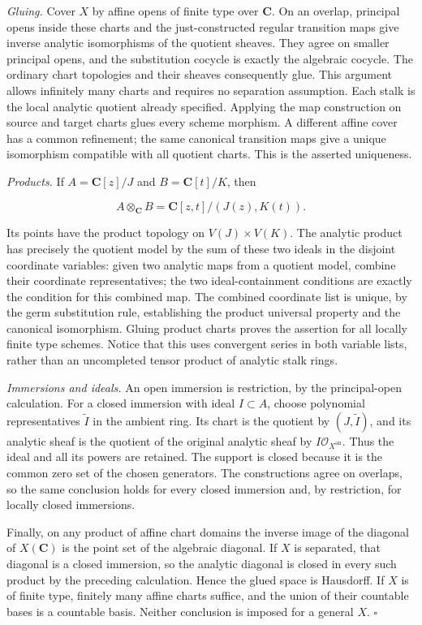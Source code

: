 \documentclass[11pt]{article}
\begin{document}
\emph{Gluing.} Cover \(X\) by affine opens of finite type over
\(\mathbf C\). On an overlap, principal opens inside these charts and
the just-constructed regular transition maps give inverse analytic
isomorphisms of the quotient sheaves. They agree on smaller principal
opens, and the substitution cocycle is exactly the algebraic cocycle.
The ordinary chart topologies and their sheaves consequently glue. This
argument allows infinitely many charts and requires no separation
assumption. Each stalk is the local analytic quotient already specified.
Applying the map construction on source and target charts glues every
scheme morphism. A different affine cover has a common refinement; the
same canonical transition maps give a unique isomorphism compatible with
all quotient charts. This is the asserted uniqueness.

\emph{Products.} If \(A=\mathbf C[z]/J\) and \(B=\mathbf C[t]/K\), then

\[
A\otimes_{\mathbf C}B=\mathbf C[z,t]/(J(z),K(t)).
\]

Its points have the product topology on \(V(J)\times V(K)\). The
analytic product has precisely the quotient model by the sum of these
two ideals in the disjoint coordinate variables: given two analytic maps
from a quotient model, combine their coordinate representatives; the two
ideal-containment conditions are exactly the condition for this combined
map. The combined coordinate list is unique, by the germ substitution
rule, establishing the product universal property and the canonical
isomorphism. Gluing product charts proves the assertion for all locally
finite type schemes. Notice that this uses convergent series in both
variable lists, rather than an uncompleted tensor product of analytic
stalk rings.

\emph{Immersions and ideals.} An open immersion is restriction, by the
principal-open calculation. For a closed immersion with ideal
\(I\subset A\), choose polynomial representatives \(\widetilde I\) in
the ambient ring. Its chart is the quotient by \((J,\widetilde I)\), and
its analytic sheaf is the quotient of the original analytic sheaf by
\(I\mathcal O_{X^{\mathrm{an}}}\). Thus the ideal and all its powers are
retained. The support is closed because it is the common zero set of the
chosen generators. The constructions agree on overlaps, so the same
conclusion holds for every closed immersion and, by restriction, for
locally closed immersions.

Finally, on any product of affine chart domains the inverse image of the
diagonal of \(X(\mathbf C)\) is the point set of the algebraic diagonal.
If \(X\) is separated, that diagonal is a closed immersion, so the
analytic diagonal is closed in every such product by the preceding
calculation. Hence the glued space is Hausdorff. If \(X\) is of finite
type, finitely many affine charts suffice, and the union of their
countable bases is a countable basis. Neither conclusion is imposed for
a general \(X\). \(\square\)
\end{document}
